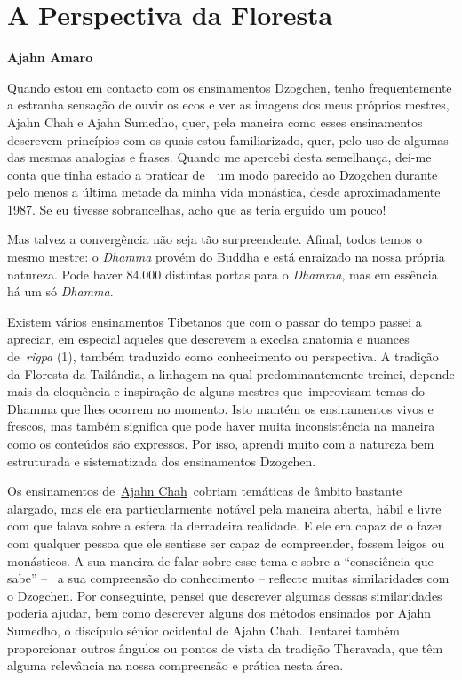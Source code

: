 \chapter{A Perspectiva da Floresta}

\textbf{Ajahn Amaro}

Quando estou em contacto com os ensinamentos Dzogchen, tenho
frequentemente a estranha sensação de ouvir os ecos e ver as imagens dos
meus próprios mestres, Ajahn Chah e Ajahn Sumedho, quer, pela maneira
como esses ensinamentos descrevem princípios com os quais estou
familiarizado, quer, pelo uso de algumas das mesmas analogias e frases.
Quando me apercebi desta semelhança, dei-me conta que tinha estado a
praticar de~~um modo parecido ao Dzogchen durante pelo menos a última
metade da minha vida monástica, desde aproximadamente 1987. Se eu
tivesse sobrancelhas, acho que as teria erguido um pouco!

Mas talvez a convergência não seja tão surpreendente. Afinal, todos
temos o mesmo mestre: o \emph{Dhamma} provém do Buddha e está enraizado
na nossa própria natureza. Pode haver 84.000 distintas portas para o
\emph{Dhamma}, mas em essência há um só \emph{Dhamma}.

Existem vários ensinamentos Tibetanos que com o passar do tempo passei a
apreciar, em especial aqueles que descrevem a excelsa anatomia e nuances
de~\emph{rigpa} (1), também traduzido como conhecimento ou perspectiva.
A tradição da Floresta da Tailândia, a linhagem na qual
predominantemente treinei, depende mais da eloquência e inspiração de
alguns mestres que~improvisam temas do Dhamma que lhes ocorrem no
momento. Isto mantém os ensinamentos vivos e frescos, mas também
significa que pode haver muita inconsistência na maneira como os
conteúdos são expressos. Por isso, aprendi muito com a natureza bem
estruturada e sistematizada dos ensinamentos Dzogchen.

Os ensinamentos
de~\href{http://www.acessoaoinsight.net/arquivo_textos_theravada/tradicao_de_florestas.php\#Chah}{Ajahn
Chah}~cobriam temáticas de âmbito bastante alargado, mas ele era
particularmente notável pela maneira aberta, hábil e livre com que
falava sobre a esfera da derradeira realidade. E ele era capaz de o
fazer com qualquer pessoa que ele sentisse ser capaz de compreender,
fossem leigos ou monásticos. A sua maneira de falar sobre esse tema e
sobre a ``consciência que sabe'' -- ~a sua compreensão do conhecimento
-- reflecte muitas similaridades com o Dzogchen. Por conseguinte, pensei
que descrever algumas dessas similaridades poderia ajudar, bem como
descrever alguns dos métodos ensinados por Ajahn Sumedho, o discípulo
sénior ocidental de Ajahn Chah. Tentarei também proporcionar outros
ângulos ou pontos de vista da tradição Theravada, que têm alguma
relevância na nossa compreensão e prática nesta área.

